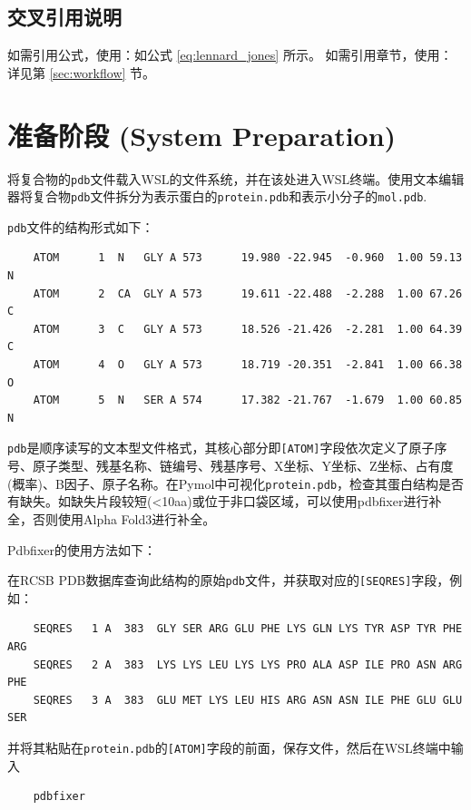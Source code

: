 \documentclass[UTF8, a4paper, 11pt]{ctexart}
\begin{document}
	\subsection{交叉引用说明}
	如需引用公式，使用：如公式 \ref{eq:lennard_jones} 所示。
	如需引用章节，使用：详见第 \ref{sec:workflow} 节。
	
	\newpage
	
	\section{准备阶段 (System Preparation)}
	将复合物的\texttt{pdb}文件载入WSL的文件系统，并在该处进入WSL终端。使用文本编辑器将复合物\texttt{pdb}文件拆分为表示蛋白的\texttt{protein.pdb}和表示小分子的\texttt{mol.pdb}.
	
	\texttt{pdb}文件的结构形式如下：
	\begin{lstlisting}
	ATOM      1  N   GLY A 573      19.980 -22.945  -0.960  1.00 59.13           N  
	ATOM      2  CA  GLY A 573      19.611 -22.488  -2.288  1.00 67.26           C  
	ATOM      3  C   GLY A 573      18.526 -21.426  -2.281  1.00 64.39           C  
	ATOM      4  O   GLY A 573      18.719 -20.351  -2.841  1.00 66.38           O  
	ATOM      5  N   SER A 574      17.382 -21.767  -1.679  1.00 60.85           N 
	\end{lstlisting}
	
	\texttt{pdb}是顺序读写的文本型文件格式，其核心部分即\texttt{[ATOM]}字段依次定义了原子序号、原子类型、残基名称、链编号、残基序号、X坐标、Y坐标、Z坐标、占有度(概率)、B因子、原子名称。在Pymol中可视化\texttt{protein.pdb}，检查其蛋白结构是否有缺失。如缺失片段较短(<10aa)或位于非口袋区域，可以使用pdbfixer进行补全，否则使用Alpha Fold3进行补全。
	
	Pdbfixer的使用方法如下：
	
	在RCSB PDB数据库查询此结构的原始\texttt{pdb}文件，并获取对应的\texttt{[SEQRES]}字段，例如：
	\begin{lstlisting}
	SEQRES   1 A  383  GLY SER ARG GLU PHE LYS GLN LYS TYR ASP TYR PHE ARG          
	SEQRES   2 A  383  LYS LYS LEU LYS LYS PRO ALA ASP ILE PRO ASN ARG PHE          
	SEQRES   3 A  383  GLU MET LYS LEU HIS ARG ASN ASN ILE PHE GLU GLU SER 
	\end{lstlisting}
	并将其粘贴在\texttt{protein.pdb}的\texttt{[ATOM]}字段的前面，保存文件，然后在WSL终端中输入
	\begin{lstlisting}
	pdbfixer
	\end{lstlisting}
	
\end{document}
